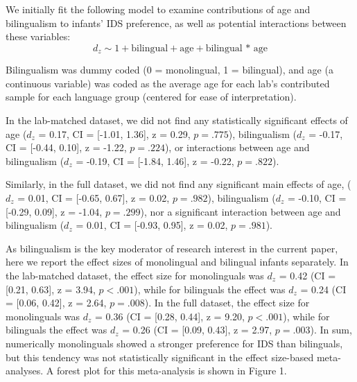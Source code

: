 \documentclass[,man,floatsintext]{apa6}
\begin{document}
We initially fit the following model to examine contributions of age and bilingualism to infants' IDS preference, as well as potential interactions between these variables: \[d_z \sim 1 + \text{bilingual} + \text{age} + \text{bilingual * age}\]

Bilingualism was dummy coded (0 = monolingual, 1 = bilingual), and age (a continuous variable) was coded as the average age for each lab's contributed sample for each language group (centered for ease of interpretation).

In the lab-matched dataset, we did not find any statistically significant effects of age (\(d_z\) = 0.17, CI = {[}-1.01, 1.36{]}, z = 0.29, \(p = .775\)), bilingualism (\(d_z\) =
-0.17, CI = {[}-0.44, 0.10{]}, z = -1.22, \(p = .224\)), or interactions between age and bilingualism (\(d_z\) = -0.19, CI = {[}-1.84, 1.46{]}, z = -0.22, \(p = .822\)).

Similarly, in the full dataset, we did not find any significant main effects of age, (\(d_z\) = 0.01, CI = {[}-0.65, 0.67{]}, z = 0.02, \(p = .982\)),
bilingualism (\(d_z\) = -0.10, CI = {[}-0.29, 0.09{]}, z = -1.04, \(p = .299\)), nor a significant interaction between age and bilingualism (\(d_z\) = 0.01, CI = {[}-0.93, 0.95{]}, z = 0.02, \(p = .981\)).

As bilingualism is the key moderator of research interest in the current paper, here we report the effect sizes of monolingual and bilingual infants separately. In the lab-matched dataset, the effect size for monolinguals was \(d_z\) = 0.42 (CI = {[}0.21, 0.63{]}, z = 3.94, \(p < .001\)), while for bilinguals the effect was \(d_z\) = 0.24 (CI = {[}0.06, 0.42{]}, z = 2.64, \(p = .008\)). In the full dataset, the effect size for monolinguals was \(d_z\) = 0.36 (CI = {[}0.28, 0.44{]}, z = 9.20, \(p < .001\)), while for bilinguals the effect was \(d_z\) = 0.26 (CI = {[}0.09, 0.43{]}, z = 2.97, \(p = .003\)). In sum, numerically monolinguals showed a stronger preference for IDS than bilinguals, but this tendency was not statistically significant in the effect size-based meta-analyses. A forest plot for this meta-analysis is shown in Figure 1.
\end{document}
